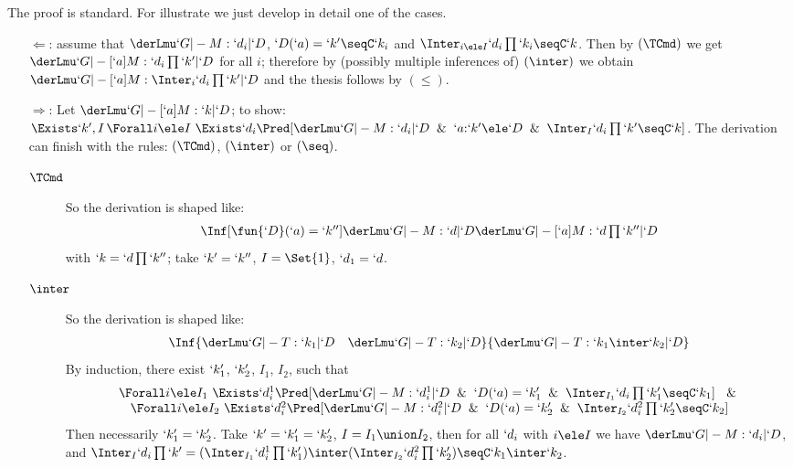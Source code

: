 \documentclass{lmcs}
\begin{document}
\begin{Proof}
The proof is standard. For illustrate we just develop in detail one of the cases. 

\begin{itemize}
\item [$\Leftarrow$:] assume that $\derLmuInt `G |- M : `d_i | `D $,  $`D(`a) =`k' \seqC `k_i$ and $\Inter_{i \ele I} `d_i\prod `k_i \seqC `k$.
	Then by $(\TCmd)$ we get $\derLmuInt `G |- [`a]M : `d_i \prod `k' | `D $ for all $i$; therefore by (possibly multiple inferences of) $(\inter)$ we obtain
	$\derLmuInt `G |- [`a]M : \Inter_i `d_i \prod `k' | `D$ and the thesis follows by $(\leq)$.

\item [$\Rightarrow$:] 
	Let $ \derLmuInt `G |- [`a]M : `k | `D $; to show: $ \Exists `k',I \, \Forall i \ele I ~ \Exists `d_i \Pred[ \derLmuInt `G |- M : `d_i | `D \And `a{:}`k' \ele `D \And \Inter_I `d_i\prod `k' \seqC `k ]  $.
The derivation can finish with the rules: $(\TCmd)$, $(\inter)$ or $(\seq)$.

 \begin{description}
 \item[$\TCmd$] 
So the derivation is shaped like:
 \[ \begin{array}{c}
\Inf	[\fun{`D }(`a)=`k'']	
	{ \InfBox{ \derLmu `G |- M : `d | `D }
	}{ \derLmu `G |- [`a]M : `d\prod `k'' | `D }
 \end{array} \]
with $`k = `d\prod `k''$; take $`k' = `k''$, $I = \Set{1}$, $`d_1 = `d$.

 \item[$\inter$] 
So the derivation is shaped like:
 \[ \begin{array}{c}
\Inf	{\InfBox{ \derLmu `G |- T : `k_1 | `D }
	\quad
	\InfBox{ \derLmu `G |- T : `k_2 | `D }
	}{ \derLmu `G |- T : `k_1\inter`k_2 | `D }
 \end{array} \]
By induction, there exist $`k'_1$, $`k'_2$, $I_1$, $I_2$, such that
 \[ \begin{array}{c}
\Forall i \ele I_1 ~ \Exists `d^1_i \Pred[ \derLmuInt `G |- M : `d^1_i | `D \And `D(`a) = `k'_1 \And \Inter_{I_1} `d_i\prod `k'_1 \seqC `k_1 ] ~ \And
	\\
\Forall i \ele I_2 ~ \Exists `d^2_i \Pred[ \derLmuInt `G |- M : `d^2_i | `D \And `D(`a) = `k'_2 \And \Inter_{I_2} `d^2_i\prod `k'_2 \seqC `k_2 ] 
 \end{array} \]
Then necessarily $`k'_1 = `k'_2$.
Take $`k' = `k'_1 = `k'_2$, $I = I_1 \union I_2$, then for all $`d_i$ with $i \ele I$ we have $ \derLmuInt `G |- M : `d_i | `D $, and $ \Inter_I `d_i\prod `k' = ( \Inter_{I_1} `d^1_i\prod `k'_1 ) \inter ( \Inter_{I_2} `d^2_i\prod `k'_2 ) \seqC `k_1 \inter `k_2 $.


\end{description}
\end{itemize}
\end{Proof}
\end{document}
